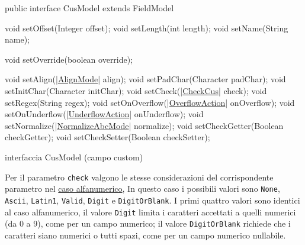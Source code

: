 \documentclass[a4paper,10pt]{report}
\newif\ifesource
\newenvironment{elisting}[1][H]
  {\captionsetup{aboveskip=0pt}\begin{listing}[#1]}
  {\end{listing}%
}
\begin{document}
\ifesource
\begin{figure*}[!htb]
\begin{lstlisting}[language=java, 
caption=interfaccia CusModel (campo custom), 
label=lst:CusModel]
public interface CusModel extends FieldModel {
    void setOffset(Integer offset);
    void setLength(int length);
    void setName(String name);
    
    void setOverride(boolean override);
    
    void setAlign((*\hyperref[lst:AlignMode]{AlignMode}*) align);
    void setPadChar(Character padChar);
    void setInitChar(Character initChar);
    void setCheck((*\hyperref[lst:CheckCus]{CheckCus}*) check);
    void setRegex(String regex);
    void setOnOverflow((*\hyperref[lst:OverflowAction]{OverflowAction}*) onOverflow);
    void setOnUnderflow((*\hyperref[lst:UnderflowAction]{UnderflowAction}*) onUnderflow);
    void setNormalize((*\hyperref[lst:NormalizeAbcMode]{NormalizeAbcMode}*) normalize);
    void setCheckGetter(Boolean checkGetter);
    void setCheckSetter(Boolean checkSetter);
}
\end{lstlisting}\index{CusModel}
\end{figure*}
\else
\begin{elisting}[!htb]
\begin{javacode}
public interface CusModel extends FieldModel {
    void setOffset(Integer offset);
    void setLength(int length);
    void setName(String name);
    
    void setOverride(boolean override);
    
    void setAlign(|\hyperref[lst:AlignMode]{AlignMode}| align);
    void setPadChar(Character padChar);
    void setInitChar(Character initChar);
    void setCheck(|\hyperref[lst:CheckCus]{CheckCus}| check);
    void setRegex(String regex);
    void setOnOverflow(|\hyperref[lst:OverflowAction]{OverflowAction}| onOverflow);
    void setOnUnderflow(|\hyperref[lst:UnderflowAction]{UnderflowAction}| onUnderflow);
    void setNormalize(|\hyperref[lst:NormalizeAbcMode]{NormalizeAbcMode}| normalize);
    void setCheckGetter(Boolean checkGetter);
    void setCheckSetter(Boolean checkSetter);
}
\end{javacode}
\caption{interfaccia CusModel (campo custom)}
\label{lst:CusModel}
\end{elisting}
\fi

Per il parametro \verb!check! valgono le stesse considerazioni del 
corrispondente parametro nel \hyperlink{abc:chk}{caso alfanumerico},
In questo caso i possibili valori sono \verb!None!, \verb!Ascii!, \verb!Latin1!, 
\verb!Valid!, \verb!Digit! e \verb!DigitOrBlank!.
I primi quattro valori sono identici al caso alfanumerico, il valore 
\verb!Digit! limita i caratteri accettati a quelli numerici (da 0 a 9), come
per un campo numerico; il valore \verb!DigitOrBlank! richiede che i caratteri
siano numerici o tutti spazi, come per un campo numerico nullabile.
\end{document}
